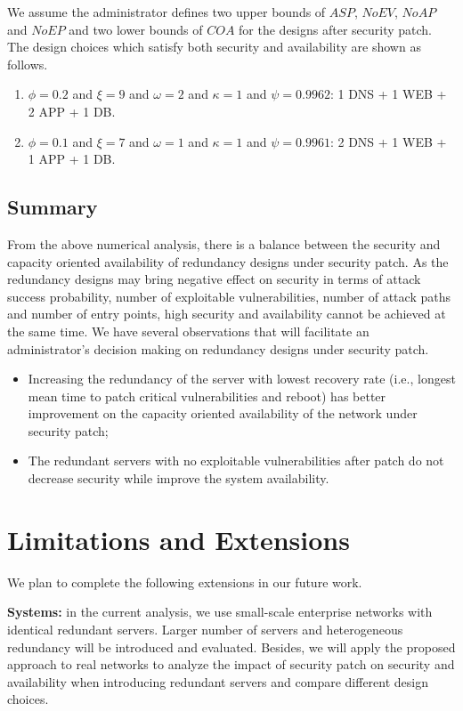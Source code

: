 \documentclass[conference]{IEEEtran}
\begin{document}
We assume the administrator defines two upper bounds of $\mathit{ASP}$, $\mathit{NoEV}$, $\mathit{NoAP}$ and $\mathit{NoEP}$ and two lower bounds of $\mathit{COA}$ for the designs after security patch. The design choices which satisfy both security and availability are shown as follows.
\begin{enumerate}
\item $\phi = 0.2$ and $\xi = 9$ and $\omega = 2$ and $\kappa = 1$ and $\psi = 0.9962$: 1 DNS + 1 WEB + 2 APP + 1 DB.
\item $\phi = 0.1$ and $\xi = 7$ and $\omega = 1$ and $\kappa = 1$ and $\psi = 0.9961$: 2 DNS + 1 WEB + 1 APP + 1 DB.
\end{enumerate}

\subsection{Summary}

From the above numerical analysis, there is a balance between the security and capacity oriented availability of redundancy designs under security patch. As the redundancy designs may bring negative effect on security in terms of attack success probability, number of exploitable vulnerabilities, number of attack paths and number of entry points, high security and availability cannot be achieved at the same time. We have several observations that will facilitate an administrator's decision making on redundancy designs under security patch.
\begin{itemize}
\item Increasing the redundancy of the server with lowest recovery rate (i.e., longest mean time to patch critical vulnerabilities and reboot) has better improvement on the capacity oriented availability of the network under security patch;
\item The redundant servers with no exploitable vulnerabilities after patch do not decrease security while improve the system availability.
\end{itemize}

\section{Limitations and Extensions}
\label{limit}

We plan to complete the following extensions in our future work.

\textbf{Systems:} in the current analysis, we use small-scale enterprise networks with identical redundant servers. Larger number of servers and heterogeneous redundancy will be introduced and evaluated. Besides, we will apply the proposed approach to real networks to analyze the impact of security patch on security and availability when introducing redundant servers and compare different design choices.
\end{document}
